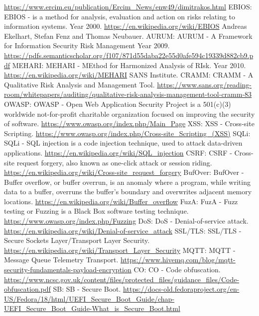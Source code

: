 \documentclass[12pt]{article}
\begin{document}
\begin{thebibliography}{9}
	\url{https://www.ercim.eu/publication/Ercim_News/enw49/dimitrakos.html}
	EBIOS: EBIOS -  is a method for analysis, evaluation and action on risks relating to information systems.
	Year 2000.
	\url{https://en.wikipedia.org/wiki/EBIOS}
	Andreas Ekelhart, Stefan Fenz and Thomas Neubauer.
	AURUM: AURUM - A Framework for Information Security Risk Management
	Year 2009.
	\url{https://pdfs.semanticscholar.org/f107/871d55daba22e55d0afe594c19339d882cb9.pdf}
	MEHARI: MEHARI - MEthod for Harmonized Analysis of RIsk.
	Year 2010.
	\url{https://en.wikipedia.org/wiki/MEHARI}
	SANS Institute.
	CRAMM: CRAMM - A Qualitative Risk Analysis and Management Tool.
	\url{https://www.sans.org/reading-room/whitepapers/auditing/qualitative-risk-analysis-management-tool-cramm-83}
	OWASP: OWASP - Open Web Application Security Project  is a 501(c)(3) worldwide not-for-profit charitable organization focused on improving the security of software.
	\url{https://www.owasp.org/index.php/Main_Page}
	XSS: XSS - Cross-site Scripting.
	\url{https://www.owasp.org/index.php/Cross-site_Scripting_(XSS)} 
	SQLi: SQLi - SQL injection is a code injection technique, used to attack data-driven applications.
	\url{https://en.wikipedia.org/wiki/SQL_injection}
	CSRF: CSRF - Cross-site request forgery, also known as one-click attack or session riding.
	\url{https://en.wikipedia.org/wiki/Cross-site_request_forgery}
	BufOver: BufOver -  Buffer overflow, or buffer overrun, is an anomaly where a program, while writing data to a buffer, overruns the buffer's boundary and overwrites adjacent memory locations.
	\url{https://en.wikipedia.org/wiki/Buffer_overflow}
	FuzA: FuzA -  Fuzz testing or Fuzzing is a Black Box software testing technique.
	\url{https://www.owasp.org/index.php/Fuzzing}
	DoS: DoS - Denial-of-service attack.
	\url{https://en.wikipedia.org/wiki/Denial-of-service_attack}
	SSL/TLS: SSL/TLS - Secure Sockets Layer/Transport Layer Security.
	\url{https://en.wikipedia.org/wiki/Transport_Layer_Security}
	MQTT: MQTT - Message Queue Telemetry Transport.
	\url{https://www.hivemq.com/blog/mqtt-security-fundamentals-payload-encryption}
	CO: CO - Code obfuscation.
	\url{https://www.ncsc.gov.uk/content/files/protected_files/guidance_files/Code-obfuscation.pdf}
	SB: SB - Secure Boot.
	\url{https://docs-old.fedoraproject.org/en-US/Fedora/18/html/UEFI_Secure_Boot_Guide/chap-UEFI_Secure_Boot_Guide-What_is_Secure_Boot.html}

\end{thebibliography}
\end{document}
